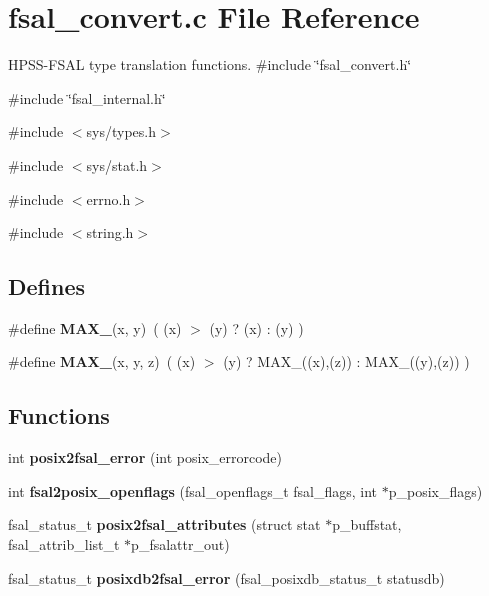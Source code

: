 \section{fsal\_\-convert.c File Reference}
\label{fsal__convert_8c}


HPSS-\/FSAL type translation functions.  
{\ttfamily \#include \char`\"{}fsal\_\-convert.h\char`\"{}}\par
{\ttfamily \#include \char`\"{}fsal\_\-internal.h\char`\"{}}\par
{\ttfamily \#include $<$sys/types.h$>$}\par
{\ttfamily \#include $<$sys/stat.h$>$}\par
{\ttfamily \#include $<$errno.h$>$}\par
{\ttfamily \#include $<$string.h$>$}\par
\subsection*{Defines}
\begin{DoxyCompactItemize}
\item 
\#define {\bfseries MAX\_}(x, y)~( (x) $>$ (y) ? (x) : (y) )\label{fsal__convert_8c_a29bc465820d0719bc24cb339e75806d0}

\item 
\#define {\bfseries MAX\_}(x, y, z)~( (x) $>$ (y) ? MAX\_((x),(z)) : MAX\_((y),(z)) )\label{fsal__convert_8c_ae28623bae2af7d233caa8038601aa853}

\end{DoxyCompactItemize}
\subsection*{Functions}
\begin{DoxyCompactItemize}
\item 
int {\bf posix2fsal\_\-error} (int posix\_\-errorcode)
\item 
int {\bf fsal2posix\_\-openflags} (fsal\_\-openflags\_\-t fsal\_\-flags, int $\ast$p\_\-posix\_\-flags)
\item 
fsal\_\-status\_\-t {\bfseries posix2fsal\_\-attributes} (struct stat $\ast$p\_\-buffstat, fsal\_\-attrib\_\-list\_\-t $\ast$p\_\-fsalattr\_\-out)\label{fsal__convert_8c_aadd7b590c15483d42c8b635e4810f506}

\item 
fsal\_\-status\_\-t {\bf posixdb2fsal\_\-error} (fsal\_\-posixdb\_\-status\_\-t statusdb)
\end{DoxyCompactItemize}


